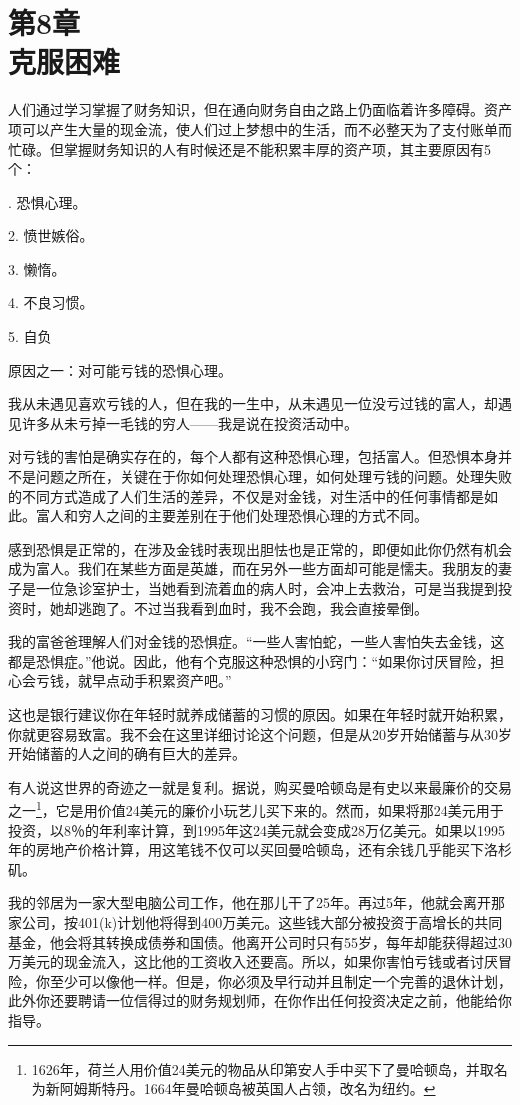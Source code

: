 \section[第8章\q 克服困难]{第8章\\克服困难}

人们通过学习掌握了财务知识，但在通向财务自由之路上仍面临着许多障碍。资产项可以产生大量的现金流，使人们过上梦想中的生活，而不必整天为了支付账单而忙碌。但掌握财务知识的人有时候还是不能积累丰厚的资产项，其主要原因有5个：

{. 恐惧心理。

2. 愤世嫉俗。

3. 懒惰。

4. 不良习惯。

5. 自负}

原因之一：对可能亏钱的恐惧心理。

我从未遇见喜欢亏钱的人，但在我的一生中，从未遇见一位没亏过钱的富人，却遇见许多从未亏掉一毛钱的穷人——我是说在投资活动中。

对亏钱的害怕是确实存在的，每个人都有这种恐惧心理，包括富人。但恐惧本身并不是问题之所在，关键在于你如何处理恐惧心理，如何处理亏钱的问题。处理失败的不同方式造成了人们生活的差异，不仅是对金钱，对生活中的任何事情都是如此。富人和穷人之间的主要差别在于他们处理恐惧心理的方式不同。

感到恐惧是正常的，在涉及金钱时表现出胆怯也是正常的，即便如此你仍然有机会成为富人。我们在某些方面是英雄，而在另外一些方面却可能是懦夫。我朋友的妻子是一位急诊室护士，当她看到流着血的病人时，会冲上去救治，可是当我提到投资时，她却逃跑了。不过当我看到血时，我不会跑，我会直接晕倒。

我的富爸爸理解人们对金钱的恐惧症。“一些人害怕蛇，一些人害怕失去金钱，这都是恐惧症。”他说。因此，他有个克服这种恐惧的小窍门：“如果你讨厌冒险，担心会亏钱，就早点动手积累资产吧。”

这也是银行建议你在年轻时就养成储蓄的习惯的原因。如果在年轻时就开始积累，你就更容易致富。我不会在这里详细讨论这个问题，但是从20岁开始储蓄与从30岁开始储蓄的人之间的确有巨大的差异。

有人说这世界的奇迹之一就是复利。据说，购买曼哈顿岛是有史以来最廉价的交易之一\footnote{1626年，荷兰人用价值24美元的物品从印第安人手中买下了曼哈顿岛，并取名为新阿姆斯特丹。1664年曼哈顿岛被英国人占领，改名为纽约。}，它是用价值24美元的廉价小玩艺儿买下来的。然而，如果将那24美元用于投资，以8％的年利率计算，到1995年这24美元就会变成28万亿美元。如果以1995年的房地产价格计算，用这笔钱不仅可以买回曼哈顿岛，还有余钱几乎能买下洛杉矶。

我的邻居为一家大型电脑公司工作，他在那儿干了25年。再过5年，他就会离开那家公司，按401(k)计划他将得到400万美元。这些钱大部分被投资于高增长的共同基金，他会将其转换成债券和国债。他离开公司时只有55岁，每年却能获得超过30万美元的现金流入，这比他的工资收入还要高。所以，如果你害怕亏钱或者讨厌冒险，你至少可以像他一样。但是，你必须及早行动并且制定一个完善的退休计划，此外你还要聘请一位信得过的财务规划师，在你作出任何投资决定之前，他能给你指导。

